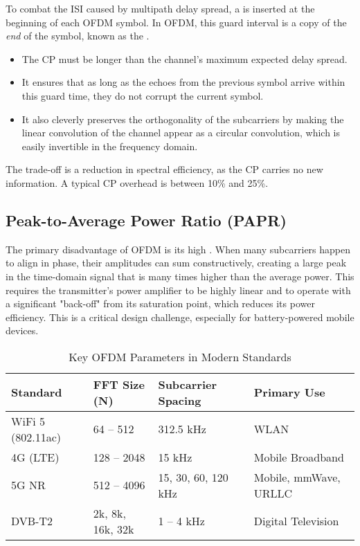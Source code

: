 To combat the ISI caused by multipath delay spread, a  is inserted at the beginning of each OFDM symbol. In OFDM, this guard interval is a copy of the \emph{end} of the symbol, known as the .
\begin{itemize}
    \item The CP must be longer than the channel's maximum expected delay spread.
    \item It ensures that as long as the echoes from the previous symbol arrive within this guard time, they do not corrupt the current symbol.
    \item It also cleverly preserves the orthogonality of the subcarriers by making the linear convolution of the channel appear as a circular convolution, which is easily invertible in the frequency domain.
\end{itemize}
The trade-off is a reduction in spectral efficiency, as the CP carries no new information. A typical CP overhead is between 10\% and 25\%.


\subsection{Peak-to-Average Power Ratio (PAPR)}

The primary disadvantage of OFDM is its high . When many subcarriers happen to align in phase, their amplitudes can sum constructively, creating a large peak in the time-domain signal that is many times higher than the average power. This requires the transmitter's power amplifier to be highly linear and to operate with a significant "back-off" from its saturation point, which reduces its power efficiency. This is a critical design challenge, especially for battery-powered mobile devices.


\begin{table}[H]
    \centering
    \caption{Key OFDM Parameters in Modern Standards}
    \label{tab:ofdm-standards}
    \begin{tabular}{@{}llll@{}}
        \toprule
        \tableheaderfont Standard & \tableheaderfont FFT Size (N) & \tableheaderfont Subcarrier Spacing & \tableheaderfont Primary Use \\
        \midrule
        WiFi 5 (802.11ac) & 64 -- 512 & 312.5 kHz & WLAN \\
        4G (LTE) & 128 -- 2048 & 15 kHz & Mobile Broadband \\
        5G NR & 512 -- 4096 & 15, 30, 60, 120 kHz & Mobile, mmWave, URLLC \\
        DVB-T2 & 2k, 8k, 16k, 32k & 1 -- 4 kHz & Digital Television \\
        \bottomrule
    \end{tabular}
\end{table}


